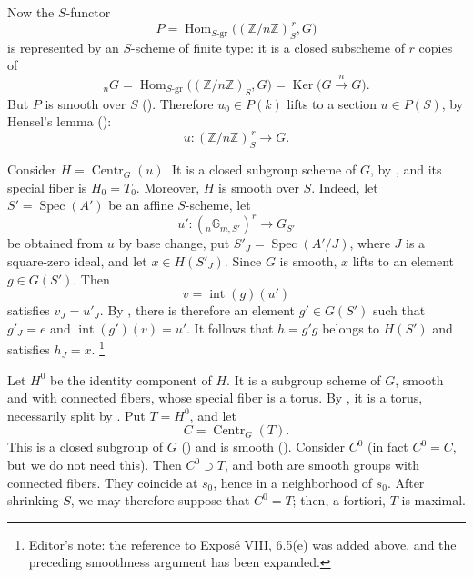 Now the \(S\)-functor
\[
  P=
  \operatorname{Hom}_{S\text{-}\mathrm{gr}}
  \bigl((\mathbb Z/n\mathbb Z)_S^{\,r},G\bigr)
\]
is represented by an \(S\)-scheme of finite type: it is a closed
subscheme of \(r\) copies of
\[
  {}_nG
  =
  \operatorname{Hom}_{S\text{-}\mathrm{gr}}
  \bigl((\mathbb Z/n\mathbb Z)_S,G\bigr)
  =
  \operatorname{Ker}\bigl(G\xrightarrow{\,n\,}G\bigr).
\]
But \(P\) is smooth over \(S\) \textup{()}.
Therefore \(u_0\in P(k)\) lifts to a section \(u\in P(S)\), by
Hensel's lemma \textup{()}:
\[
  u\colon(\mathbb Z/n\mathbb Z)_S^{\,r}\longrightarrow G.
\]

Consider \(H=\operatorname{Centr}_G(u)\).  It is a closed subgroup
scheme of \(G\), by , and its special fiber is
\(H_0=T_0\).  Moreover, \(H\) is smooth over \(S\).  Indeed, let
\(S'=\operatorname{Spec}(A')\) be an affine \(S\)-scheme, let
\[
  u'\colon({}_n\mathbb G_{m,S'})^r\longrightarrow G_{S'}
\]
be obtained from \(u\) by base change, put
\(S'_J=\operatorname{Spec}(A'/J)\), where \(J\) is a square-zero
ideal, and let \(x\in H(S'_J)\).  Since \(G\) is smooth, \(x\) lifts
to an element \(g\in G(S')\).  Then
\[
  v=\operatorname{int}(g)(u')
\]
satisfies \(v_J=u'_J\).  By , there is therefore an
element \(g'\in G(S')\) such that \(g'_J=e\) and
\(\operatorname{int}(g')(v)=u'\).  It follows that \(h=g'g\) belongs
to \(H(S')\) and satisfies \(h_J=x\).
\footnote{Editor's note: the reference to Exposé VIII, 6.5(e) was
added above, and the preceding smoothness argument has been
expanded.}

Let \(H^0\) be the identity component of \(H\).  It is a subgroup
scheme of \(G\), smooth and with connected fibers, whose special
fiber is a torus.  By , it is a torus, necessarily split
by .  Put \(T=H^0\), and let
\[
  C=\operatorname{Centr}_G(T).
\]
This is a closed subgroup of \(G\) \textup{()}
and is smooth \textup{()}.  Consider \(C^0\)
\textup{(in fact \(C^0=C\), but we do not need this)}.  Then
\(C^0\supset T\), and both are smooth groups with connected fibers.
They coincide at \(s_0\), hence in a neighborhood of \(s_0\).
After shrinking \(S\), we may therefore suppose that \(C^0=T\);
then, a fortiori, \(T\) is maximal.

